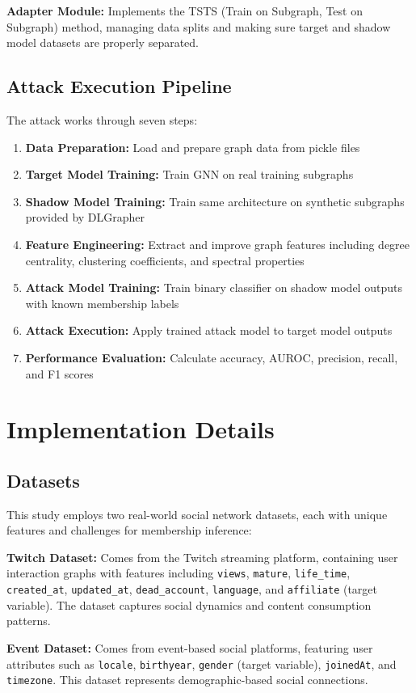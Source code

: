 \documentclass{article}
\begin{document}
\textbf{Adapter Module:} Implements the TSTS (Train on Subgraph, Test on Subgraph) method, managing data splits and making sure target and shadow model datasets are properly separated.

\subsection{Attack Execution Pipeline}
The attack works through seven steps:
\begin{enumerate}
\item \textbf{Data Preparation:} Load and prepare graph data from pickle files
\item \textbf{Target Model Training:} Train GNN on real training subgraphs
\item \textbf{Shadow Model Training:} Train same architecture on synthetic subgraphs provided by DLGrapher
\item \textbf{Feature Engineering:} Extract and improve graph features including degree centrality, clustering coefficients, and spectral properties
\item \textbf{Attack Model Training:} Train binary classifier on shadow model outputs with known membership labels
\item \textbf{Attack Execution:} Apply trained attack model to target model outputs
\item \textbf{Performance Evaluation:} Calculate accuracy, AUROC, precision, recall, and F1 scores
\end{enumerate} 

\section{Implementation Details}
\subsection{Datasets}
This study employs two real-world social network datasets, each with unique features and challenges for membership inference:

\textbf{Twitch Dataset:} Comes from the Twitch streaming platform, containing user interaction graphs with features including \texttt{views}, \texttt{mature}, \texttt{life\_time}, \texttt{created\_at}, \texttt{updated\_at}, \texttt{dead\_account}, \texttt{language}, and \texttt{affiliate} (target variable). The dataset captures social dynamics and content consumption patterns.

\textbf{Event Dataset:} Comes from event-based social platforms, featuring user attributes such as \texttt{locale}, \texttt{birthyear}, \texttt{gender} (target variable), \texttt{joinedAt}, and \texttt{timezone}. This dataset represents demographic-based social connections.
\end{document}
